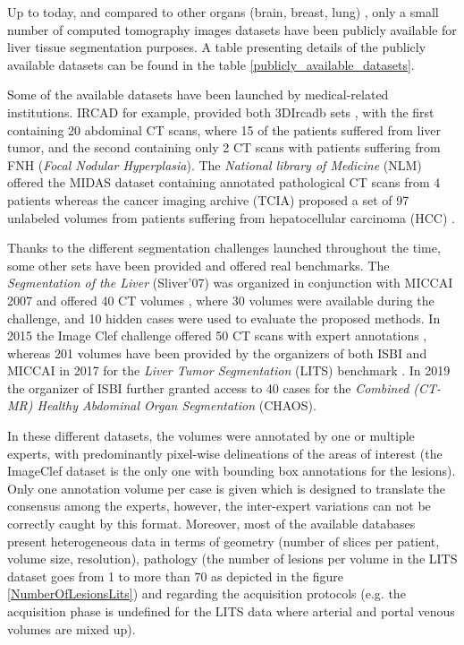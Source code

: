 \documentclass[]{article}
\begin{document}
	Up to today, and compared to other organs (brain, breast, lung) \cite{GrandChallenge}, only
	a small number of computed tomography images datasets have been publicly
	available for liver tissue segmentation purposes. A table presenting
	details of the publicly available datasets can be found in the table \ref{publicly_available_datasets}.
	
	
	Some of the available datasets have been launched by medical-related
	institutions. IRCAD for example, provided both 3DIrcadb sets \cite{3DIrcadB}, with the first containing 20 abdominal CT
	scans, where 15 of the patients suffered from liver tumor, and the
	second containing only 2 CT scans with patients suffering from FNH
	(\emph{Focal Nodular Hyperplasia}).
	The \emph{National library of Medicine} (NLM) offered the MIDAS dataset
	containing annotated pathological CT scans from 4 patients \cite{MIDAS} whereas the cancer imaging archive (TCIA)
	proposed a set of 97 unlabeled volumes from patients suffering from
	hepatocellular carcinoma (HCC) \cite{Clark2013}.
	
	Thanks to the different segmentation challenges launched throughout the
	time, some other sets have been provided and offered real benchmarks.
	The \emph{Segmentation of the Liver} (Sliver'07) was organized in
	conjunction with MICCAI 2007 and offered 40 CT volumes \cite{VanGinneken2007}, where 30
	volumes were available during the challenge, and 10 hidden cases were
	used to evaluate the proposed methods. In 2015 the Image Clef challenge
	offered 50 CT scans with expert annotations \cite{ImageClef}, whereas 201 volumes have been provided by the organizers
	of both ISBI and MICCAI in 2017 for the \emph{Liver Tumor Segmentation}
	(LITS) benchmark \cite{Bilic2019}. In 2019 the organizer of ISBI
	further granted access to 40 cases for the \emph{Combined (CT-MR)
		Healthy Abdominal Organ Segmentation} (CHAOS)\cite{CHAOS}.
	
	In these different datasets, the volumes were annotated by one or
	multiple experts, with predominantly pixel-wise delineations of the
	areas of interest (the ImageClef dataset is the only one with bounding
	box annotations for the lesions). Only one annotation volume per case is
	given which is designed to translate the consensus among the experts,
	however, the inter-expert variations can not be correctly caught by this
	format. Moreover, most of the available databases present heterogeneous
	data in terms of geometry (number of slices per patient, volume size,
	resolution), pathology (the number of lesions per volume in the LITS
	dataset goes from 1 to more than 70 as depicted in the figure \ref{NumberOfLesionsLits}) and regarding the
	acquisition protocols (e.g. the acquisition phase is undefined for the
	LITS data where arterial and portal venous volumes are mixed up).\\
	
\end{document}
